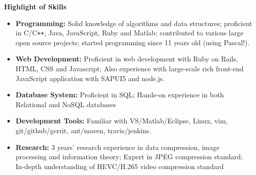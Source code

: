 \documentclass[letterpaper,10pt]{article}
\newcommand{\resheading}[1]{{\large \colorbox{mygrey}{\begin{minipage}{\textwidth}{\textbf{#1 \vphantom{p\^{E}}}}\end{minipage}}}}
\begin{document}
\resheading{Highlight of Skills}
\begin{itemize}
\itemsep0em
\item {\textbf {Programming:}} Solid knowledge of algorithms and data structures; proficient in C/C{}\verb!++!, Java, JavaScript, Ruby and Matlab; contributed to various large open source projects; started programming since 11 years old (using Pascal!).
\item{\textbf {Web Development:}} Proficient in web development with Ruby on Rails, HTML, CSS and Javascript; Also experience with large-scale rich front-end JavaScript application with SAPUI5 and node.js.
\item{\textbf {Database System:}} Proficient in SQL; Hands-on experience in both Relational and NoSQL databases
\item{\textbf {Development Tools:}} Familiar with VS/Matlab/Eclipse, Linux, vim, git/github/gerrit, ant/maven, travis/jenkins.
\item{\textbf {Research:}} 3 years' research experience in data compression, image processing and information theory; Expert in JPEG compression standard; In-depth understanding of HEVC/H.265 video compression standard

\end{itemize}
\end{document}
